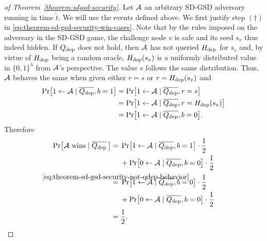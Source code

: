 \begin{proof}[of Theorem~\ref{theorem:sdgsd-security}]
	Let $\mathcal{A}$ an arbitrary SD-GSD adversary running in time $\tilde{t}$. We will use the events defined above. We first justify step $(\dagger)$ in \eqref{eq:theorem-sd-gsd-security-win-cases}. Note that by the rules imposed on the adversary in the SD-GSD game, the challenge node $v$ is safe and its seed $s_v$ thus indeed hidden. If $Q_\mathrm{dep}$ does not hold, then $\mathcal{A}$ has not queried $H_\mathrm{dep}$ for $s_v$ and, by virtue of $H_\mathrm{dep}$ being a random oracle, $H_\mathrm{dep}(s_v)$ is a uniformly distributed value in $\{0, 1\}^\lambda$ from $\mathcal{A}$'s perspective. The value $s$ follows the same distribution. Thus, $\mathcal{A}$ behaves the same when given either $r = s$ or $r = H_\mathrm{dep}(s_v)$ and
	\begin{align} \label{eq:theorem-sd-gsd-security-not-qdep-behavior}
		\begin{split}
			\pr{1 \from \adv \mid \overline{\qdep}, b = 1} & = \pr{1 \from \adv \mid \overline{\qdep}, r = s}          \\
			& = \pr{1 \from \adv \mid \overline{\qdep}, r = \hdep(s_v)} \\
			& = \pr{1 \from \adv \mid \overline{\qdep}, b = 0}.
		\end{split}
	\end{align}
	Therefore
	\begin{align*}
		\pr{\wins \mid \overline{\qdep} \,} & = \begin{aligned}[t]
			                                         & \pr{1 \from \adv \mid \overline{\qdep}, b = 1} \cdot \frac{1}{2}   \\
			                                         & + \pr{0 \from \adv \mid \overline{\qdep}, b = 0} \cdot \frac{1}{2}
		                                        \end{aligned}                                                                             \\
		                                    & \stackrel{\mathclap{\eqref{eq:theorem-sd-gsd-security-not-qdep-behavior}}}{=} \begin{aligned}[t]
			                                                                                                                     & \pr{1 \from \adv \mid \overline{\qdep}, b = 0} \cdot \frac{1}{2}   \\
			                                                                                                                     & + \pr{0 \from \adv \mid \overline{\qdep}, b = 0} \cdot \frac{1}{2}
		                                                                                                                    \end{aligned} \\
		                                    & = \frac{1}{2}.
	\end{align*}


\end{proof}
